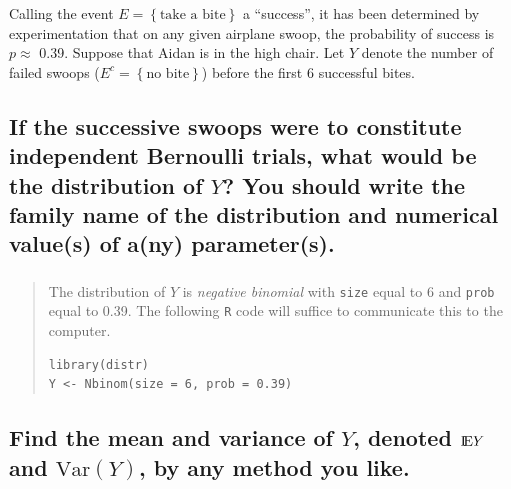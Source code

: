 \documentclass[11pt]{article}
\begin{document}
Calling the event \( E = \left\{ \mbox{take a bite}\right\} \) a
``success'', it has been determined by experimentation that on any
given airplane swoop, the probability of success is \(p \approx\)
0.39. Suppose that Aidan is in the high chair. Let \(Y\) denote the
number of failed swoops (\(E^{c}=\left\{ \mbox{no bite}\right\}\))
before the first 6 successful bites.

\subsection[If the successive swoops were to constitute independent Bernoulli trials, what would be the distribution of \(Y\)? You should write the family name of the distribution and numerical value(s) of a(ny) parameter(s).]{If the successive swoops were to constitute independent Bernoulli trials, what would be the distribution of \(Y\)? You should write the family name of the distribution and numerical value(s) of a(ny) parameter(s).}
\label{sec-2-1}

\subsubsection[]{}
\label{sec-2-1-1}
\begin{quote}
The distribution of \(Y\) is \emph{negative binomial} with \texttt{size} equal to
6 and \texttt{prob} equal to 0.39.  The following \texttt{R} code will
suffice to communicate this to the computer.

\begin{verbatim}
library(distr)
Y <- Nbinom(size = 6, prob = 0.39)
\end{verbatim}

\end{quote}
\subsection[Find the mean and variance of \(Y\), denoted \(\E Y\) and \(\mathrm{Var}(Y)\), by any method you like.]{Find the mean and variance of \(Y\), denoted \(\E Y\) and \(\mathrm{Var}(Y)\), by any method you like.}
\label{sec-2-2}
\end{document}
